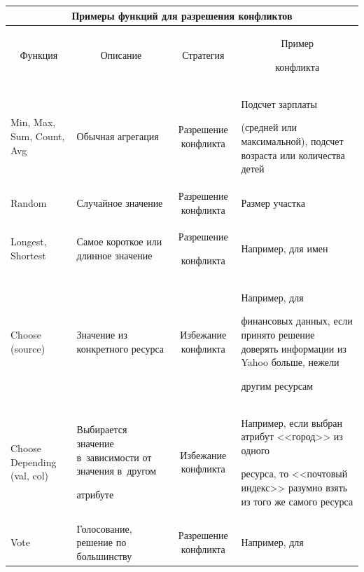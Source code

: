   \begin{table}\small

  \begin{center}



  \tabcolsep=5pt

  \begin{tabular}{|l|p{34mm}|c|p{40mm}|}


  \multicolumn{4}{c}{Примеры функций для разрешения конфликтов}\\[6pt]

  \hline

  \multicolumn{1}{|c|}{Функция}&\multicolumn{1}{c|}{Описание}&Стратегия&\multicolumn{1}{c|}{Пример

конфликта}\\

  \hline

Min, Max, Sum, Count, Avg&Обычная агрегация&Разрешение конфликта&Подсчет зарплаты

(средней или максимальной), подсчет возраста или количества детей\\

\hline

Random&Случайное значение&Разрешение конфликта&Размер участка\\

\hline

Longest, Shortest&Самое короткое или длинное значение&Разрешение

конфликта&Например, для имен\\

\hline

Choose (source)&Значение из конкретного ресурса&Избежание конфликта&Например, для

финансовых данных, если принято решение доверять информации из Yahoo больше, нежели

другим ресурсам\\

\hline

Choose Depending (val, col)&Выбирается значение в~зависимости от значения в~другом

атрибуте&Избежание конфликта&Например, если выбран атрибут <<город>> из одного

ресурса, то <<почтовый индекс>> разумно взять из того же самого ресурса\\

\hline

Vote&Голосование, решение по большинству&Разрешение конфликта&Например, для


\end{tabular}
\end{center}
\end{table}
